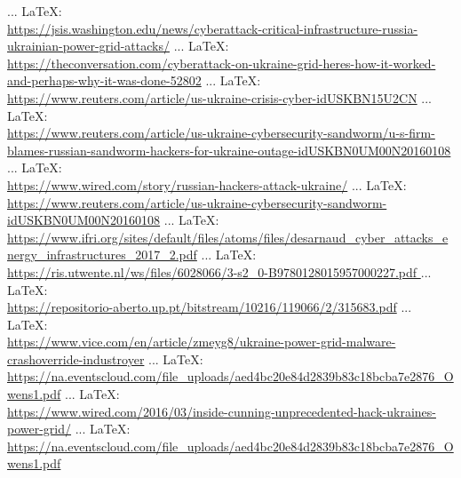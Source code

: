 \begin{thebibliography}{99}
{{{{		 ... \LaTeX:\\ \url{https://jsis.washington.edu/news/cyberattack-critical-infrastructure-russia-ukrainian-power-grid-attacks/}
		 ... \LaTeX:\\ \url{https://theconversation.com/cyberattack-on-ukraine-grid-heres-how-it-worked-and-perhaps-why-it-was-done-52802}
		 ... \LaTeX:\\ \url{https://www.reuters.com/article/us-ukraine-crisis-cyber-idUSKBN15U2CN}
		 ... \LaTeX:\\ \url{https://www.reuters.com/article/us-ukraine-cybersecurity-sandworm/u-s-firm-blames-russian-sandworm-hackers-for-ukraine-outage-idUSKBN0UM00N20160108}
		 ... \LaTeX:\\ \url{https://www.wired.com/story/russian-hackers-attack-ukraine/}
		 ... \LaTeX:\\ \url{https://www.reuters.com/article/us-ukraine-cybersecurity-sandworm-idUSKBN0UM00N20160108}
		 ... \LaTeX:\\ \url{https://www.ifri.org/sites/default/files/atoms/files/desarnaud_cyber_attacks_energy_infrastructures_2017_2.pdf}
		 ... \LaTeX:\\ \url{ https://ris.utwente.nl/ws/files/6028066/3-s2_0-B9780128015957000227.pdf
		}
		 ... \LaTeX:\\ \url{https://repositorio-aberto.up.pt/bitstream/10216/119066/2/315683.pdf}
		 ... \LaTeX:\\ \url{ https://www.vice.com/en/article/zmeyg8/ukraine-power-grid-malware-crashoverride-industroyer}
		 ... \LaTeX:\\ \url{https://na.eventscloud.com/file_uploads/aed4bc20e84d2839b83c18bcba7e2876_Owens1.pdf}
		 ... \LaTeX:\\ \url{https://www.wired.com/2016/03/inside-cunning-unprecedented-hack-ukraines-power-grid/}
		 ... \LaTeX:\\ \url{ https://na.eventscloud.com/file_uploads/aed4bc20e84d2839b83c18bcba7e2876_Owens1.pdf
		}
				
}}}}
\end{thebibliography}
